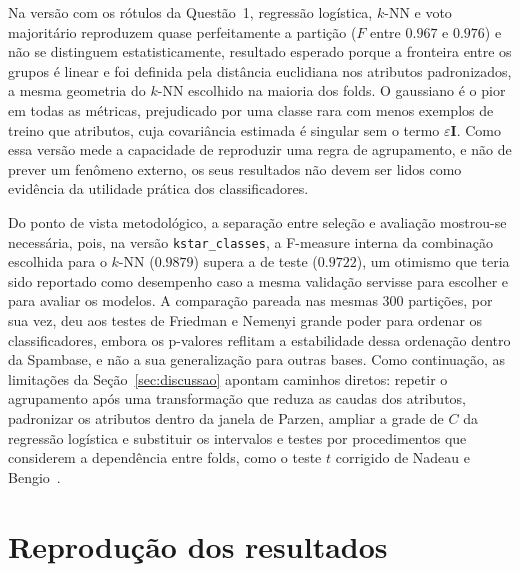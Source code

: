 \documentclass[11pt,a4paper]{article}
\begin{document}
Na versão com os rótulos da Questão~1, regressão logística, $k$-NN e voto majoritário reproduzem quase perfeitamente
a partição ($F$ entre $\num{0.967}$ e $\num{0.976}$) e não se distinguem estatisticamente, resultado esperado porque a
fronteira entre os grupos é linear e foi definida pela distância euclidiana nos atributos padronizados, a mesma
geometria do $k$-NN escolhido na maioria dos folds. O gaussiano é o pior em todas as métricas, prejudicado por uma
classe rara com menos exemplos de treino que atributos, cuja covariância estimada é singular sem o termo
$\varepsilon\mathbf{I}$. Como essa versão mede a capacidade de reproduzir uma regra de agrupamento, e não de prever
um fenômeno externo, os seus resultados não devem ser lidos como evidência da utilidade prática dos classificadores.

Do ponto de vista metodológico, a separação entre seleção e avaliação mostrou-se necessária, pois, na versão
\texttt{kstar\_classes}, a F-measure interna da combinação escolhida para o $k$-NN ($\num{0.9879}$) supera a de teste
($\num{0.9722}$), um otimismo que teria sido reportado como desempenho caso a mesma validação servisse para escolher
e para avaliar os modelos. A comparação pareada nas mesmas 300 partições, por sua vez, deu aos testes de Friedman e
Nemenyi grande poder para ordenar os classificadores, embora os p-valores reflitam a estabilidade dessa ordenação
dentro da Spambase, e não a sua generalização para outras bases. Como continuação, as limitações da
Seção~\ref{sec:discussao} apontam caminhos diretos: repetir o agrupamento após uma transformação que reduza as caudas
dos atributos, padronizar os atributos dentro da janela de Parzen, ampliar a grade de $C$ da regressão logística e
substituir os intervalos e testes por procedimentos que considerem a dependência entre folds, como o teste $t$
corrigido de Nadeau e Bengio~\cite{nadeau2003inference}.

\begin{otherlanguage}{american}
\printbibliography[heading=bibintoc,title={Referências}]
\end{otherlanguage}

\appendix
\section{Reprodução dos resultados}\label{app:reproducao}
\end{document}
